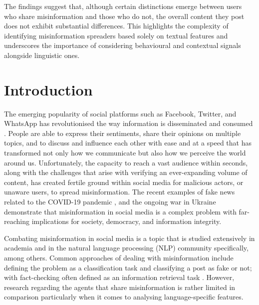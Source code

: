 The findings suggest that, although certain distinctions emerge between users who share misinformation and those who do not, the overall content they post does not exhibit substantial differences. This highlights the complexity of identifying misinformation spreaders based solely on textual features and underscores the importance of considering behavioural and contextual signals alongside linguistic ones.


\section{Introduction}
The emerging popularity of social platforms such as Facebook, Twitter, and WhatsApp has revolutionised the way information is disseminated and consumed \cite{FacebookWorldwide, murthy2018twitter, deshmukh2015analysis}. People are able to express their sentiments, share their opinions on multiple topics, and to discuss and influence each other %
with ease and at a speed that has transformed not only how we communicate but also how we perceive the world around us. Unfortunately, the capacity to reach a vast audience within seconds, along with the challenges that arise with verifying an ever-expanding volume of content, has created fertile ground within social media for malicious actors, or unaware users, to spread misinformation. The recent examples of fake news related to the COVID-19 pandemic \cite{evanega2020coronavirus}, and the ongoing war in Ukraine \cite{pierri2023propaganda} demonstrate that misinformation in social media is a complex problem with far-reaching implications for society, democracy, and information integrity.

Combating misinformation in social media is a topic that is studied extensively in academia \cite{vosoughi2018spread, pennycook2020implied} and in the natural language processing (NLP) community \cite{su2020motivations} specifically, among others. Common approaches of dealing with misinformation include defining the problem as a classification task \cite{serrano2020nlp, hamid2020fake} and classifying a post as fake or not; with fact-checking \cite{thorne2018automated} often defined as an information retrieval task \cite{lazarski2021using}. However, research regarding the agents that share misinformation is rather limited in comparison  \cite{shu2020fakenewsnet, rangel2020overview, dou2021user} particularly when it comes to analysing language-specific features.

